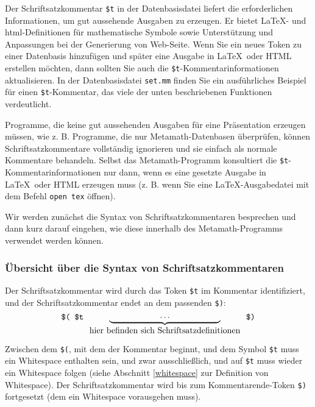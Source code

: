 Der Schriftsatzkommentar \texttt{\$t} in der Datenbasisdatei liefert die erforderlichen Informationen, um gut aussehende Ausgaben zu erzeugen. Er bietet \LaTeX- und {\sc html}-Definitionen für mathematische Symbole sowie Unterstützung und Anpassungen bei der Generierung von Web-Seite. Wenn Sie ein neues Token zu einer Datenbasis hinzufügen und später eine Ausgabe in \LaTeX\ oder {\sc HTML} erstellen möchten, dann sollten Sie auch die \texttt{\$t}-Kommentarinformationen aktualisieren. In der Datenbasisdatei \texttt{set.mm} finden Sie ein ausführliches Beispiel für einen \texttt{\$t}-Kommentar, das viele der unten beschriebenen Funktionen verdeutlicht.

Programme, die keine gut aussehenden Ausgaben für eine Präsentation erzeugen müssen, wie z. B. Programme, die nur Metamath-Datenbasen überprüfen, können Schriftsatzkommentare vollständig ignorieren und sie einfach als normale Kommentare behandeln. Selbst das Metamath-Programm konsultiert die \texttt{\$t}-Kommentarinformationen nur dann, wenn es eine gesetzte Ausgabe in \LaTeX\ oder {\sc HTML} erzeugen muss (z. B. wenn Sie eine \LaTeX-Ausgabedatei mit dem Befehl \texttt{open tex} öffnen).

Wir werden zunächst die Syntax von Schriftsatzkommentaren besprechen und dann kurz darauf eingehen, wie diese innerhalb des Metamath-Programms verwendet werden können.

\subsubsection{Übersicht über die Syntax von Schriftsatzkommentaren}

Der Schriftsatzkommentar wird durch das Token \texttt{\$t} im Kommentar identifiziert, und der Schriftsatzkommentar endet an dem passenden \texttt{\$)}:
\[
  \mbox{\tt \$(\ }
  \mbox{\tt \$t\ }
  \underbrace{
    \mbox{\tt \ \ \ \ \ \ \ \ \ \ \ }
    \cdots
    \mbox{\tt \ \ \ \ \ \ \ \ \ \ \ }
  }_{\mbox{hier befinden sich Schriftsatzdefinitionen}}
  \mbox{\tt \ \$)}
\]

Zwischen dem \texttt{\$(}, mit dem der Kommentar beginnt, und dem Symbol \texttt{\$t} muss ein Whitespace enthalten sein, und zwar ausschließlich, und auf \texttt{\$t} muss wieder ein Whitespace folgen (siehe Abschnitt \ref{whitespace} zur Definition von Whitespace). Der Schriftsatzkommentar wird bis zum Kommentarende-Token \texttt{\$)} fortgesetzt (dem ein Whitespace vorausgehen muss).


